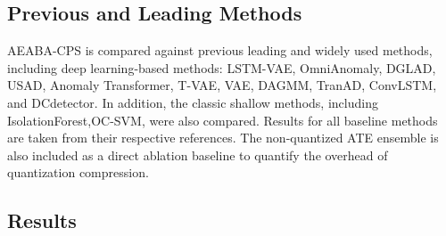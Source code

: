 \documentclass[pdflatex,sn-mathphys-num]{sn-jnl}
\theoremstyle{thmstyleone}
\theoremstyle{thmstyletwo}
\theoremstyle{thmstylethree}
\begin{document}
\subsection{Previous and Leading Methods}
AEABA-CPS is compared against previous leading and widely used methods, including deep learning-based methods: LSTM-VAE\cite{xu2022anomaly,audibert2020usad,park2018multimodal}, 
OmniAnomaly\cite{xu2022anomaly,audibert2020usad,Omnianomaly2019robust},
DGLAD\cite{luo2025dual},
USAD\cite{audibert2020usad}, 
Anomaly Transformer\cite{xu2022anomaly,energyefficient2025yang}, 
T-VAE\cite{li2025t},
VAE\cite{belay2023unsupervised,kingma2019introduction}, DAGMM\cite{xu2018unsupervised,audibert2020usad,DAGMM2018deep}, TranAD\cite{tuli2022tranad}, ConvLSTM\cite{belay2023unsupervised,shi2015convolutional}, and DCdetector\cite{li2025t,yang2023dcdetector}. In addition, 
the classic shallow methods, including IsolationForest\cite{xu2022anomaly,audibert2020usad,liu2008isolation},OC-SVM\cite{belay2023unsupervised,li2003improving}, were also compared.
Results for all baseline methods are taken from their respective references. The non-quantized ATE ensemble is also included as a direct ablation baseline to quantify the overhead of quantization compression.


\subsection{Results}  
\end{document}
